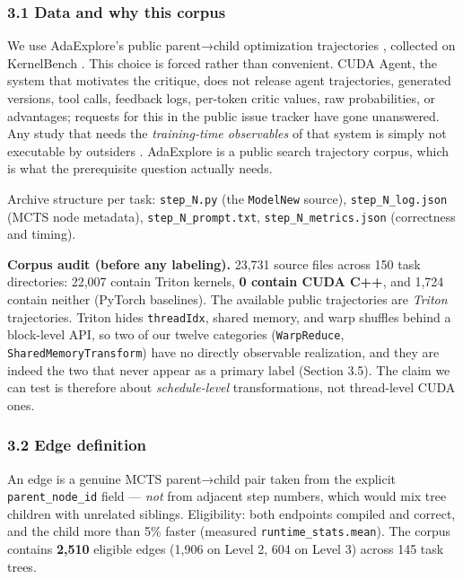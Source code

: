 \documentclass[
  11pt,
]{article}
\begin{document}
\hypertarget{data-and-why-this-corpus}{%
\subsubsection{3.1 Data and why this corpus}\label{data-and-why-this-corpus}}

We use AdaExplore's public parent→child optimization trajectories \cite{adaexplore3}, collected on KernelBench \cite{kernelbench2}. This choice is forced rather than convenient. CUDA Agent, the system that motivates the critique, does not release agent trajectories, generated versions, tool calls, feedback logs, per-token critic values, raw probabilities, or advantages; requests for this in the public issue tracker have gone unanswered. Any study that needs the \emph{training-time observables} of that system is simply not executable by outsiders \cite{cuda1}. AdaExplore is a public search trajectory corpus, which is what the prerequisite question actually needs.

Archive structure per task: \texttt{step\_N.py} (the \texttt{ModelNew} source), \texttt{step\_N\_log.json} (MCTS node metadata), \texttt{step\_N\_prompt.txt}, \texttt{step\_N\_metrics.json} (correctness and timing).

\textbf{Corpus audit (before any labeling).} 23,731 source files across 150 task directories: 22,007 contain Triton kernels, \textbf{0 contain CUDA C++}, and 1,724 contain neither (PyTorch baselines). The available public trajectories are \emph{Triton} trajectories. Triton hides \texttt{threadIdx}, shared memory, and warp shuffles behind a block-level API, so two of our twelve categories (\texttt{WarpReduce}, \texttt{SharedMemoryTransform}) have no directly observable realization, and they are indeed the two that never appear as a primary label (Section 3.5). The claim we can test is therefore about \emph{schedule-level} transformations, not thread-level CUDA ones.

\hypertarget{edge-definition}{%
\subsubsection{3.2 Edge definition}\label{edge-definition}}

An edge is a genuine MCTS parent→child pair taken from the explicit \texttt{parent\_node\_id} field --- \emph{not} from adjacent step numbers, which would mix tree children with unrelated siblings. Eligibility: both endpoints compiled and correct, and the child more than 5\% faster (measured \texttt{runtime\_stats.mean}). The corpus contains \textbf{2,510} eligible edges (1,906 on Level 2, 604 on Level 3) across 145 task trees.
\end{document}
